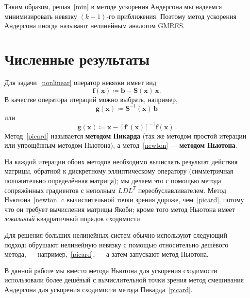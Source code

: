 \documentclass[a4paper, 14pt]{extarticle}
\newcommand{\vect}[1]{\boldsymbol{\mathbf{#1}}}
\begin{document}
	Таким образом, решая~\eqref{min} в методе ускорения Андерсона мы надеемся минимизировать невязку $(k+1)$-го приближения. Поэтому метод ускорения Андерсона иногда называют нелинейным аналогом GMRES.
	
	\section{Численные результаты}
	
	Для задачи~\eqref{nonlinear} оператор невязки имеет вид
	$$
		\vect f(\vect x) \coloneqq \vect b - \vect S(\vect x)\,\vect x.
	$$
	В качестве оператора итераций можно выбрать, например, 
	\begin{equation}\label{picard}
		\vect g(\vect x) \coloneqq \vect S^{-1}(\vect x)\,\vect b
	\end{equation}
	или
	\begin{equation}\label{newton}
		\vect g(\vect x) \coloneqq \vect x - \left[ \vect f'(\vect x) \right]^{-1} \vect f(\vect x).
	\end{equation} 
	Метод~\eqref{picard} называется \textbf{методом Пикарда} (так же методом простой итерации или упрощённым методом Ньютона), а метод~\eqref{newton} --- \textbf{методом Ньютона}.
	
	На каждой итерации обоих методов необходимо вычислять результат действия матрицы, обратной к дискретному эллиптическому оператору (симметричная положительно определённая матрица); мы делаем это с помощью метода сопряжённых градиентов с неполным $LDL^T$ переобуславливателем. Метод Ньютона~\eqref{newton} c вычислительной точки зрения дороже, чем~\eqref{picard}, потому что он требует вычисления матрицы Якоби; кроме того метод Ньютона имеет \textit{локальный} квадратичный порядок сходимости.
	
	Для решения больших нелинейных систем обычно используют следующий подход: обрушают нелинейную невязку с помощью относительно дешёвого метода, --- например,~\eqref{picard}, --- а затем запускают метод Ньютона.
	
	В данной работе мы вместо метода Ньютона для ускорения сходимости использовали более дешёвый с вычислительной точки зрения метод смешивания Андерсона\footnotemark{} для ускорения сходимости метода Пикарда~\eqref{picard}.
	
\end{document}
